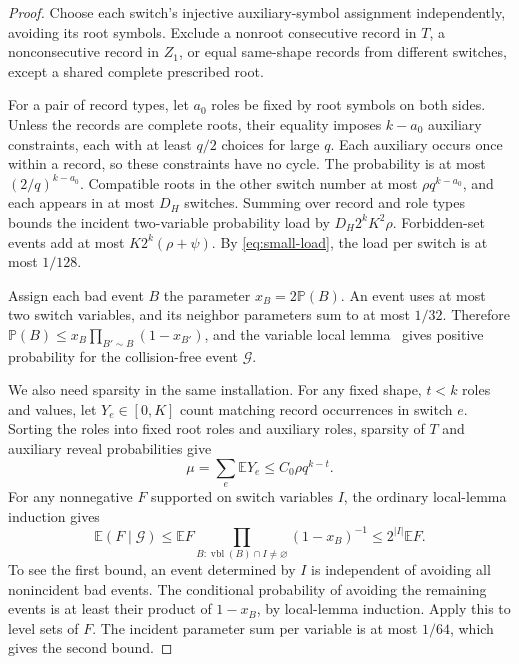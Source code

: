 \documentclass[12pt,letterpaper,onecolumn]{article}
\theoremstyle{definition}
\newcommand{\E}{\mathbb E}
\newcommand{\Prb}{\mathbb P}
\newcommand{\cG}{\mathcal G}
\DeclareMathOperator{\vbl}{vbl}
\begin{document}
\begin{proof}
Choose each switch's injective auxiliary-symbol assignment independently, avoiding its root symbols. Exclude a nonroot consecutive record in $T$, a nonconsecutive record in $Z_1$, or equal same-shape records from different switches, except a shared complete prescribed root.

For a pair of record types, let $a_0$ roles be fixed by root symbols on both sides. Unless the records are complete roots, their equality imposes $k-a_0$ auxiliary constraints, each with at least $q/2$ choices for large $q$. Each auxiliary occurs once within a record, so these constraints have no cycle. The probability is at most $(2/q)^{k-a_0}$. Compatible roots in the other switch number at most $\rho q^{k-a_0}$, and each appears in at most $D_H$ switches. Summing over record and role types bounds the incident two-variable probability load by $D_H2^kK^2\rho$. Forbidden-set events add at most $K2^k(\rho+\psi)$. By \eqref{eq:small-load}, the load per switch is at most $1/128$.

Assign each bad event $B$ the parameter $x_B=2\Prb(B)$. An event uses at most two switch variables, and its neighbor parameters sum to at most $1/32$. Therefore $\Prb(B)\le x_B\prod_{B'\sim B}(1-x_{B'})$, and the variable local lemma~\cite{moser2010} gives positive probability for the collision-free event $\cG$.

We also need sparsity in the same installation. For any fixed shape, $t<k$ roles and values, let $Y_e\in[0,K]$ count matching record occurrences in switch $e$. Sorting the roles into fixed root roles and auxiliary roles, sparsity of $T$ and auxiliary reveal probabilities give
\begin{equation}
 \mu=\sum_e\E Y_e\le C_0\rho q^{k-t}.
 \label{eq:projection-mean}
\end{equation}
For any nonnegative $F$ supported on switch variables $I$, the ordinary local-lemma induction gives
\begin{equation}
 \E(F\mid\cG)\le\E F\prod_{B:\vbl(B)\cap I\ne\varnothing}(1-x_B)^{-1}
 \le2^{|I|}\E F.
 \label{eq:conditional}
\end{equation}
To see the first bound, an event determined by $I$ is independent of avoiding all nonincident bad events. The conditional probability of avoiding the remaining events is at least their product of $1-x_B$, by local-lemma induction. Apply this to level sets of $F$. The incident parameter sum per variable is at most $1/64$, which gives the second bound.


\end{proof}
\end{document}
